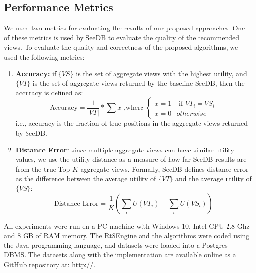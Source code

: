 \subsection{Performance Metrics}
%
We used two metrics for evaluating the results of our proposed approaches.
%
One of these metrics is used by SeeDB \cite{DBLP:journals/pvldb/VartakMPP14} to evaluate the quality of the recommended views. 
%
To evaluate the quality and correctness of the proposed algorithms, we used the following metrics:
%
\begin{enumerate}
%
\item \textbf{Accuracy:} if $\{VS\}$ is the set of aggregate views with the highest utility, and $\{VT\}$ is the 
set of aggregate views returned by the baseline SeeDB, then the accuracy is defined as:
\[
\text{Accuracy} = \frac{1}{|VT|} * \sum{x}  \text{   ,where  }  \begin{cases}   x = 1 & \text{ if } VT_i = VS_i \\ x = 0 & otherwise \end{cases}
\]
i.e., accuracy is the fraction of true positions in the aggregate views returned by SeeDB.
%
\item \textbf{Distance Error:} since multiple aggregate views can have similar utility values, we use the utility distance as a measure of how far SeeDB results are from the true Top-$K$ aggregate views. 
%
Formally, SeeDB \cite{vartakseedb} defines distance error as the difference between the average utility of $\{VT\}$ and the average utility of $\{VS\}$:
\[
\text{Distance Error} = \frac{1}{K} (\sum_{i}{ U(VT_i)} - \sum_{i}{U(VS_i)})
\]
%
\end{enumerate}
%

All experiments were run on a PC machine with Windows 10, Intel CPU 2.8 Ghz and 8 GB of RAM memory.
%
The RtSEngine and the algorithms were coded using the Java programming language, and datasets were loaded into a Postgres DBMS.
%
The datasets along with the implementation are available online as a GitHub repository at: http://.
%
